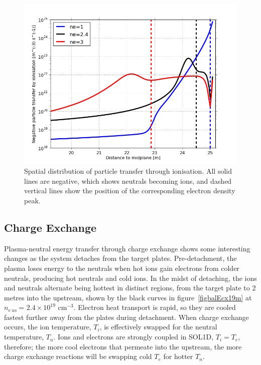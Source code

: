 \documentclass[12pt]{article}  %
\providecommand{\noNe}[1]{{${#1}\times 10^{19}$ cm$^{-3}$}} %
\providecommand{\neus}{$n_{e~us}~$} %
\begin{document}
\begin{figure}
\includegraphics[scale=0.5]{Figures/sol1d/balSizthick20m.png}
\centering
\caption{Spatial distribution of particle transfer through ionisation. All solid lines are negative, which shows neutrals becoming ions, and dashed vertical lines show the position of the corresponding electron density peak.}\label{figbalSizthick20m}
\end{figure}


\subsection{Charge Exchange}\label{ssecCX}
Plasma-neutral energy transfer through charge exchange shows some interesting changes as the system detaches from the target plates. Pre-detachment, the plasma loses energy to the neutrals when hot ions gain electrons from colder neutrals, producing hot neutrals and cold ions. In the midst of detaching, the ions and neutrals alternate being hottest in distinct regions, from the target plate to 2 metres into the upstream, shown by the black curves in figure~\ref{figbalEcx19m} at \neus = \noNe{2.4}. Electron heat transport is rapid, so they are cooled fastest further away from the plates during detachment. When charge exchange occurs, the ion temperature, $T_i$, is effectively swapped for the neutral temperature, $T_n$. Ions and electrons are strongly coupled in SOL1D, $T_i = T_e$, therefore; the more cool electrons that permeate into the upstream, the more charge exchange reactions will be swapping cold $T_e$ for hotter $T_n$.
\end{document}
